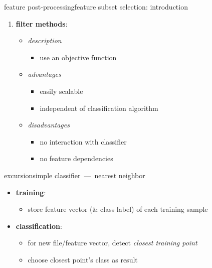 \begin{frame}{feature post-processing}{feature subset selection: introduction}
\begin{enumerate}
				\bigskip
                \item<4->	\textbf{filter methods}:
                    \begin{itemize}
                        \item \textit{description}
                            \begin{itemize}
                                \item  use an objective function
                            \end{itemize}
                         \item<5-> \textit{advantages}
                            \begin{itemize}
                                \item   easily scalable
                                \item   independent of classification algorithm
                            \end{itemize}
                         \item<6-> \textit{disadvantages}
                            \begin{itemize}
                                \item   no interaction with classifier
                                \item   no feature dependencies
                            \end{itemize}
                    \end{itemize}
			\end{enumerate}
		\end{frame}

        \begin{frame}{excursion}{simple classifier~---~nearest neighbor}
            \vspace{-3mm}
            \begin{itemize}
                \item	    \textbf{training}:
                    \begin{itemize}
                        \item store feature vector (\& class label) of each training sample
                    \end{itemize}
                \item<2->	\textbf{classification}:
                    \begin{itemize}
                        \item for new file/feature vector, detect \textit{closest training point}
                        \item   choose closest point's class as result
                    \end{itemize}
            \end{itemize}
            \vspace{-4mm}
        \end{frame}
        
